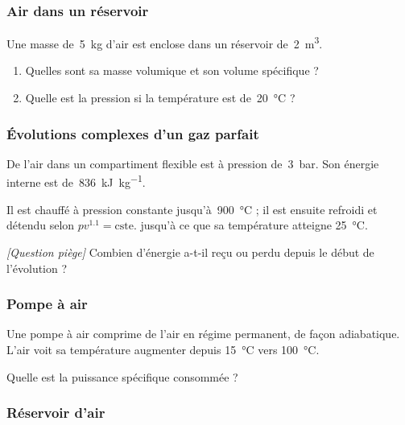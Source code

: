 \begin{boiboiboite}
	\propair
	\isentropiques
	\isothermes
\end{boiboiboite}


\subsubsection{Air dans un réservoir}

	Une masse de~\SI{5}{\kilogram} d’air est enclose dans un réservoir de~\SI{2}{\metre\cubed}. 

	\begin{enumerate}
		\item Quelles sont sa masse volumique et son volume spécifique ?
		\item Quelle est la pression si la température est de~\SI{20}{\degreeCelsius} ?
	\end{enumerate}


\subsubsection{Évolutions complexes d’un gaz parfait}

	De l’air dans un compartiment flexible est à pression de~\SI{3}{\bar}. Son énergie interne est de~\SI{836}{\kilo\joule\per\kilogram}.
	
	Il est chauffé à pression constante jusqu’à~\SI{900}{\degreeCelsius} ; il est ensuite refroidi et détendu selon $p v^{\num{1.1}} = \text{cste.}$ jusqu’à ce que sa température atteigne \SI{25}{\degreeCelsius}.

	\textit{[Question piège]} Combien d’énergie a-t-il reçu ou perdu depuis le début de l’évolution ?

\subsubsection{Pompe à air}

	Une pompe à air comprime de l’air en régime permanent, de façon adiabatique. L’air voit sa température augmenter depuis \SI{15}{\degreeCelsius} vers \SI{100}{\degreeCelsius}.\nopagebreak
	
	Quelle est la puissance spécifique consommée ?

\subsubsection{Réservoir d’air}

